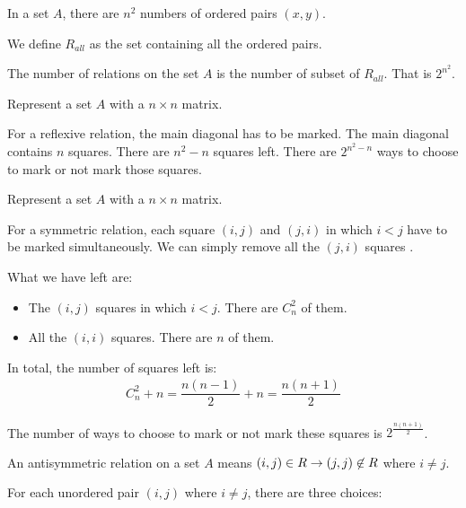             \par In a set $A$, there are $n^{2}$ numbers of ordered pairs $(x, y)$.
            \par We define $R_{all}$ as the set containing all the ordered pairs.
            \par The number of relations on the set $A$ is the number of subset of $R_{all}$.
            That is $2^{n^{2}}$.
            \par Represent a set $A$ with a $n \times n$ matrix.
            \par For a reflexive relation,
            the main diagonal has to be marked. The main diagonal contains $n$ squares.
            There are $n^{2} - n$ squares left. There are $2^{n^{2} - n}$ ways to choose to
            mark or not mark those squares.
            \par Represent a set $A$ with a $n \times n$ matrix.
            \par For a symmetric relation, each square $(i, j)$ and $(j, i)$ in which $i < j$ have
            to be marked simultaneously. We can simply remove all the $(j, i)$ squares .
            \par What we have left are:
            \begin{itemize}
                \item The $(i, j)$ squares in which $i < j$. There are $C^{2}_{n}$ of them.
                \item All the $(i, i)$ squares. There are $n$ of them.
            \end{itemize}
            \par In total, the number of squares left is:
            \begin{align*}
                C^{2}_n + n = \dfrac{n(n - 1)}{2} + n = \dfrac{n(n + 1)}{2}
            \end{align*}
            \par The number of ways to choose to mark or not mark these squares is 
            $2^{\frac{n(n + 1)}{2}}$.
            \par An antisymmetric relation on a set $A$ means $(i, j) \in R \rightarrow (j, j) \not
            \in R$ where $i \neq j$.
            \par For each unordered pair $(i, j)$ where $i \neq j$, there are three choices:
